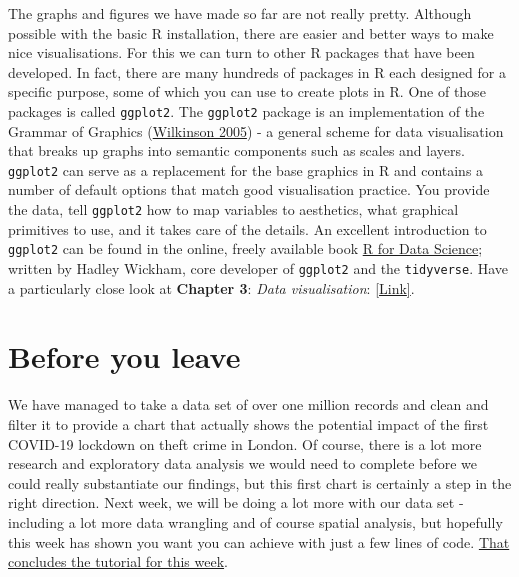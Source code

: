 \documentclass[
]{book}
\begin{document}
The graphs and figures we have made so far are not really pretty. Although possible with the basic R installation, there are easier and better ways to make nice visualisations. For this we can turn to other R packages that have been developed. In fact, there are many hundreds of packages in R each designed for a specific purpose, some of which you can use to create plots in R. One of those packages is called \texttt{ggplot2}. The \texttt{ggplot2} package is an implementation of the Grammar of Graphics (\href{https://en.wikipedia.org/wiki/Leland_Wilkinson}{Wilkinson 2005}) - a general scheme for data visualisation that breaks up graphs into semantic components such as scales and layers. \texttt{ggplot2} can serve as a replacement for the base graphics in R and contains a number of default options that match good visualisation practice. You provide the data, tell \texttt{ggplot2} how to map variables to aesthetics, what graphical primitives to use, and it takes care of the details. An excellent introduction to \texttt{ggplot2} can be found in the online, freely available book \href{https://r4ds.had.co.nz/data-visualisation.html}{R for Data Science}; written by Hadley Wickham, core developer of \texttt{ggplot2} and the \texttt{tidyverse}. Have a particularly close look at \textbf{Chapter 3}: \emph{Data visualisation}: \href{https://r4ds.had.co.nz/data-visualisation.html}{{[}Link{]}}.

\hypertarget{byl-w04}{%
\section{Before you leave}\label{byl-w04}}

We have managed to take a data set of over one million records and clean and filter it to provide a chart that actually shows the potential impact of the first COVID-19 lockdown on theft crime in London. Of course, there is a lot more research and exploratory data analysis we would need to complete before we could really substantiate our findings, but this first chart is certainly a step in the right direction. Next week, we will be doing a lot more with our data set - including a lot more data wrangling and of course spatial analysis, but hopefully this week has shown you want you can achieve with just a few lines of code. \href{https://www.youtube.com/watch?v=NKyYr2pbXUM}{That concludes the tutorial for this week}.
\end{document}
